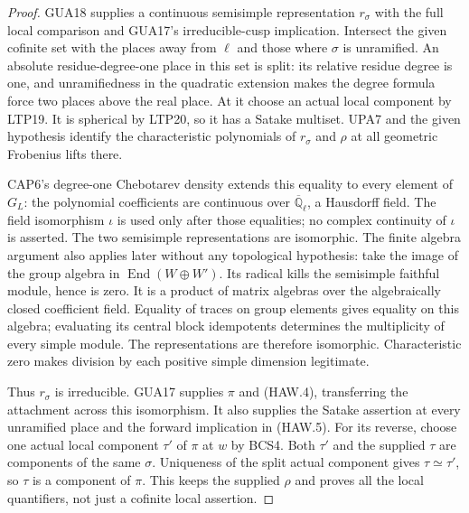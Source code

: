 \begin{proof}
GUA18 supplies a continuous semisimple representation $r_\sigma$
with the full local comparison and GUA17's irreducible-cusp
implication.  Intersect the given cofinite set with the places
away from $\ell$ and those where $\sigma$ is unramified.
An absolute residue-degree-one place in this set is split:
its relative residue degree is one, and unramifiedness in the
quadratic extension makes the degree formula force two places
above the real place.  At it choose an actual local component
by LTP19.  It is spherical by LTP20, so it has a Satake multiset.
UPA7 and the given hypothesis identify the characteristic
polynomials of $r_\sigma$ and $\rho$ at all geometric Frobenius
lifts there.

CAP6's degree-one Chebotarev density extends this equality to
every element of $G_L$: the polynomial coefficients are
continuous over $\overline{\mathbb Q}_\ell$, a Hausdorff field.
The field isomorphism $\iota$ is used only after those
equalities; no complex continuity of $\iota$ is asserted.
The two semisimple representations are isomorphic.  The finite
algebra argument also applies later without any topological
hypothesis: take the image of the group algebra in
$\operatorname{End}(W\oplus W')$.  Its radical kills the
semisimple faithful module, hence is zero.  It is a product of
matrix algebras over the algebraically closed coefficient field.
Equality of traces on group elements gives equality on this
algebra; evaluating its central block idempotents determines
the multiplicity of every simple module.  The representations
are therefore isomorphic.  Characteristic zero makes division
by each positive simple dimension legitimate.

Thus $r_\sigma$ is irreducible.  GUA17 supplies $\pi$ and
(HAW.4), transferring the attachment across this isomorphism.
It also supplies the Satake assertion at every unramified place
and the forward implication in (HAW.5).  For its reverse,
choose one actual local component $\tau'$ of $\pi$ at $w$
by BCS4.
Both $\tau'$ and the supplied $\tau$ are components of the same
$\sigma$.  Uniqueness of the split actual component gives
$\tau\simeq\tau'$, so $\tau$ is a component of $\pi$.
This keeps the supplied $\rho$ and proves all the local
quantifiers, not just a cofinite local assertion.
\end{proof}


